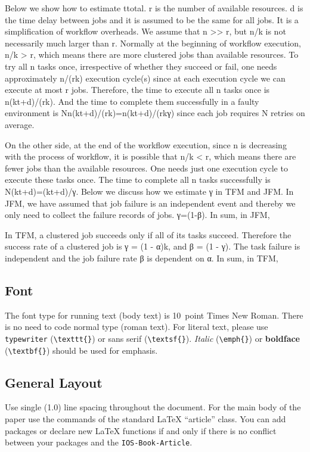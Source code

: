 \documentclass{IOS-Book-Article}
\begin{document}
Below we show how to estimate ttotal. r is the number of available resources. d is the time delay between jobs and it is assumed to be the same for all jobs. It is a simplification of workflow overheads. We assume that n >> r, but n/k is not necessarily much larger than r. Normally at the beginning of workflow execution, n/k > r, which means there are more clustered jobs than available resources. To try all n tasks once, irrespective of whether they succeed or fail, one needs approximately n/(rk) execution cycle(s) since at each execution cycle we can execute at most r jobs. Therefore, the time to execute all n tasks once is n(kt+d)/(rk). And the time to complete them successfully in a faulty environment is Nn(kt+d)/(rk)=n(kt+d)/(rkγ) since each job requires N retries on average.  

On the other side, at the end of the workflow execution, since n is decreasing with the process of workflow, it is possible that n/k < r, which means there are fewer jobs than the available resources. One needs just one execution cycle to execute these tasks once. The time to complete all n tasks successfully is N(kt+d)=(kt+d)/γ. 
Below we discuss how we estimate γ in TFM and JFM. In JFM, we have assumed that job failure is an independent event and thereby we only need to collect the failure records of jobs. γ=(1-β). In sum, in JFM, 

In TFM, a clustered job succeeds only if all of its tasks succeed. Therefore the success rate of a clustered job is γ = (1 - α)k, and β = (1 - γ). The task failure is independent and the job failure rate β is dependent on α. In sum, in TFM,

\subsection{Font}

The font type for running text (body text) is 10~point Times New Roman.
There is no need to code normal type (roman text). For literal text, please use
\texttt{type\-writer} (\verb|\texttt{}|)
or \textsf{sans serif} (\verb|\textsf{}|). \emph{Italic} (\verb|\emph{}|)
or \textbf{boldface} (\verb|\textbf{}|) should be used for emphasis.

\subsection{General Layout}
Use single (1.0) line spacing throughout the document. For the main
body of the paper use the commands of the standard \LaTeX{}
``article'' class. You can add packages or declare new \LaTeX{}
functions if and only if there is no conflict between your packages
and the \texttt{IOS-Book-Article}.
\end{document}
